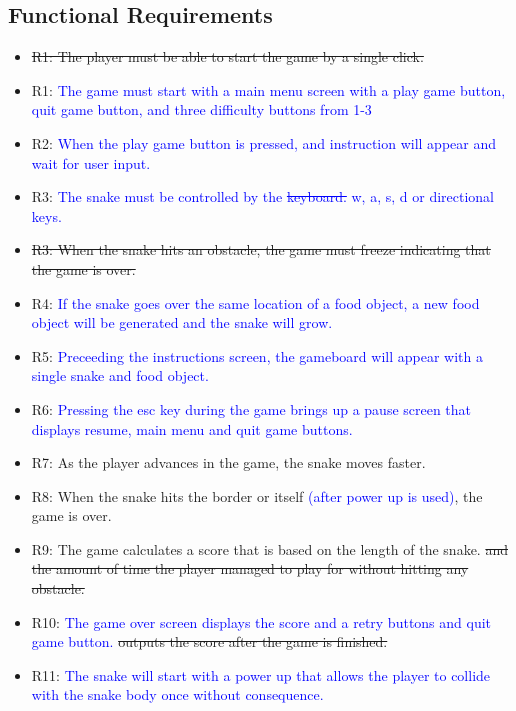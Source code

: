 \documentclass[12pt]{article}
\begin{document}
\subsection{Functional Requirements}
\begin{itemize}
\item \sout{ R1: The player must be able to start the game by a single click.}
\item R1: \textcolor{blue}{The game must start with a main menu screen with a play game button, quit game button, and three difficulty buttons from 1-3}


\item R2: \textcolor{blue}{When the play game button is pressed, and instruction will appear and wait for user input.}
\item R3: \textcolor{blue}{The snake must be controlled by the \sout{keyboard.} w, a, s, d or directional keys.}
\item \sout{R3: When the snake hits an obstacle, the game must freeze indicating that the game is over.}
\item R4: \textcolor{blue}{If the snake goes over the same location of a food object, a new food object will be generated and the snake will grow.}
\item R5: \textcolor{blue}{Preceeding the instructions screen, the gameboard will appear with a single snake and food object.}

\item R6: \textcolor{blue}{Pressing the esc key during the game brings up a pause screen that displays resume, main menu and quit game buttons.}
\item R7: As the player advances in the game, the snake moves faster.
\item R8: When the snake hits the border or itself \textcolor{blue}{(after power up is used)}, the game is over.
\item R9: The game calculates a score that is based on the length of the snake. \sout{and the amount of time the player managed to play for without hitting any obstacle.}
\item R10: \textcolor{blue}{The game over screen displays the score and a retry buttons and quit game button.} \sout{outputs the score after the game is finished.}
\item R11: \textcolor{blue}{The snake will start with a power up that allows the player to collide with the snake body once without consequence.}


\end{itemize}
\end{document}
